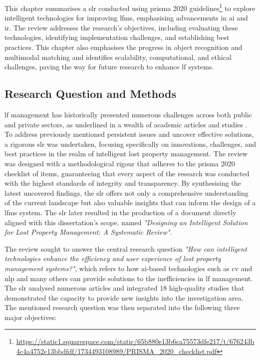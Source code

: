 This chapter summarises a \ac{slr} conducted using \ac{prisma} 2020 \cite{Page2021} guidelines\footnote{\url{https://static1.squarespace.com/static/65b880e13b6ca75573dfe217/t/676243b4c4a4752e13bbdfdf/1734493108989/PRISMA_2020_checklist.pdf}} to explore intelligent technologies for improving \ac{lfms}, emphasising advancements in \ac{ai} and \ac{ir}. The review addresses the research's objectives, including evaluating these technologies, identifying implementation challenges, and establishing best practices. This chapter also emphasises the progress in object recognition and multimodal matching and identifies scalability, computational, and ethical challenges, paving the way for future research to enhance \ac{lf} systems.

\subsection{Research Question and Methods} \label{subsec:slr}

\ac{lf} management has historically presented numerous challenges across both public and private sectors, as underlined in a wealth of academic articles and studies \cite{Prawira2024}. To address previously mentioned persistent issues and uncover effective solutions, a rigorous \ac{slr} was undertaken, focusing specifically on innovations, challenges, and best practices in the realm of intelligent lost property management. The review was designed with a methodological rigour that adheres to the \ac{prisma} 2020 checklist of items, guaranteeing that every aspect of the research was conducted with the highest standards of integrity and transparency. By synthesising the latest uncovered findings, the \ac{slr} offers not only a comprehensive understanding of the current landscape but also valuable insights that can inform the design of a \ac{lfms} system. The \ac{slr} later resulted in the production of a document directly aligned with this dissertation's scope, named \textit{"Designing an Intelligent Solution for Lost Property Management: A Systematic Review"}.

The review sought to answer the central research question \textit{"How can intelligent technologies enhance the efficiency and user experience of lost property management systems?"}, which refers to how \ac{ai}-based technologies such as \ac{cv} and \ac{nlp} and many others can provide solutions to the inefficiencies in \ac{lf} management. The \ac{slr} analysed numerous articles and integrated 18 high-quality studies that demonstrated the capacity to provide new insights into the investigation area. The mentioned research question was then separated into the following three major objectives:

